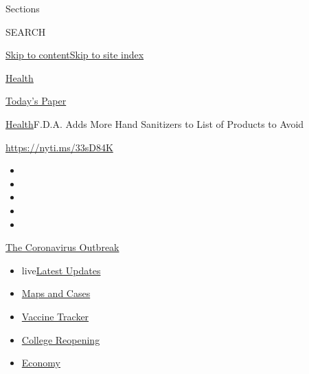 Sections

SEARCH

\protect\hyperlink{site-content}{Skip to
content}\protect\hyperlink{site-index}{Skip to site index}

\href{https://www.nytimes3xbfgragh.onion/section/health}{Health}

\href{https://myaccount.nytimes3xbfgragh.onion/auth/login?response_type=cookie\&client_id=vi}{}

\href{https://www.nytimes3xbfgragh.onion/section/todayspaper}{Today's
Paper}

\href{/section/health}{Health}\textbar{}F.D.A. Adds More Hand Sanitizers
to List of Products to Avoid

\url{https://nyti.ms/33sD84K}

\begin{itemize}
\item
\item
\item
\item
\item
\end{itemize}

\href{https://www.nytimes3xbfgragh.onion/news-event/coronavirus?action=click\&pgtype=Article\&state=default\&region=TOP_BANNER\&context=storylines_menu}{The
Coronavirus Outbreak}

\begin{itemize}
\tightlist
\item
  live\href{https://www.nytimes3xbfgragh.onion/2020/08/04/world/coronavirus-cases.html?action=click\&pgtype=Article\&state=default\&region=TOP_BANNER\&context=storylines_menu}{Latest
  Updates}
\item
  \href{https://www.nytimes3xbfgragh.onion/interactive/2020/us/coronavirus-us-cases.html?action=click\&pgtype=Article\&state=default\&region=TOP_BANNER\&context=storylines_menu}{Maps
  and Cases}
\item
  \href{https://www.nytimes3xbfgragh.onion/interactive/2020/science/coronavirus-vaccine-tracker.html?action=click\&pgtype=Article\&state=default\&region=TOP_BANNER\&context=storylines_menu}{Vaccine
  Tracker}
\item
  \href{https://www.nytimes3xbfgragh.onion/2020/08/02/us/covid-college-reopening.html?action=click\&pgtype=Article\&state=default\&region=TOP_BANNER\&context=storylines_menu}{College
  Reopening}
\item
  \href{https://www.nytimes3xbfgragh.onion/live/2020/08/04/business/stock-market-today-coronavirus?action=click\&pgtype=Article\&state=default\&region=TOP_BANNER\&context=storylines_menu}{Economy}
\end{itemize}

